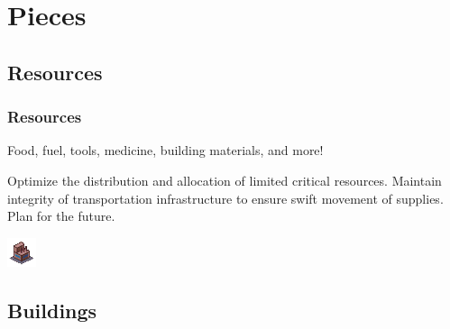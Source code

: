 \documentclass[ascpectratio=169]{beamer}
\begin{document}

\section{Pieces}

\subsection{Resources}


\begin{frame}

  \frametitle{Resources}

  \begin{center}
    {\large Food, fuel, tools, medicine, building materials, and more!}
  \end{center}

  \begin{outline}
    \1 Optimize the distribution and allocation of limited critical resources.
    \1 Maintain integrity of transportation infrastructure to ensure swift
    movement of supplies.
    \1 Plan for the future.
  \end{outline}
  
  \begin{center}
    \includegraphics[scale=3.0]{../../Images/factory.png}
  \end{center}

\end{frame}


\subsection{Buildings}

\end{document}
